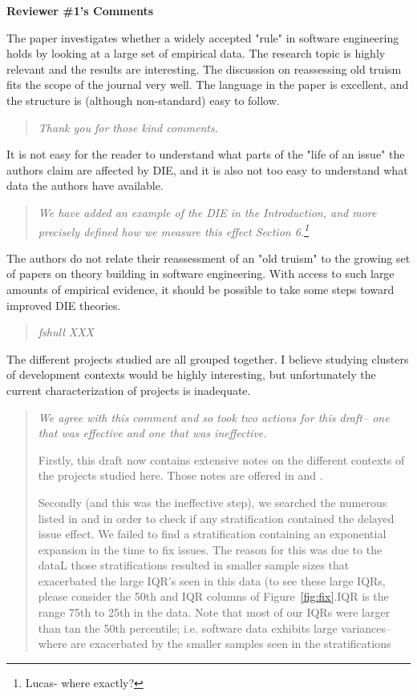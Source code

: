 {\bf Reviewer \#1's Comments}


The paper investigates whether a widely
accepted "rule" in software engineering holds by looking at
a large set of empirical data. The research topic is highly
relevant and the results are interesting.   The discussion
on reassessing old truism fits the scope of the journal very
well.  The language in the paper is excellent, and the
structure is (although non-standard) easy to follow.

\begin{quote}{\em Thank you for those kind comments.}\end{quote}

It is not easy for the reader to understand what parts
of the "life of an issue" the authors claim are affected by
DIE, and it is also not too easy to understand what data the
authors have available.  

\begin{quote}{\em  We have added an example of the DIE in the Introduction, and more precisely defined how we measure this effect Section 6.\footnote{Lucas- where exactly?} }\end{quote}
 
 The authors do not relate their reassessment of an
"old truism" to the growing set of papers on theory building
in software engineering. With access to such large amounts
of empirical evidence, it should be possible to take some
steps toward improved DIE theories. 

\begin{quote}{\em  fshull XXX }\end{quote}

The different projects studied are all grouped together. I
believe studying clusters of development contexts would be
highly interesting, but unfortunately the current
characterization of projects is inadequate.  

\begin{quote}{\em  We agree with this comment and so took two actions for this draft-- one that was effective and one that was ineffective. 

Firstly, this draft now contains extensive notes on the different contexts of the
projects studied here. Those notes are offered in  and .

Secondly (and this was the ineffective step), we  searched the numerous   listed in  and 
in order to check if any stratification contained the delayed issue effect. We failed to find a stratification
containing an exponential expansion in the time to fix issues. The reason for this was due to the dataL those
stratifications resulted in smaller sample sizes that exacerbated the large IQR's seen in this data
(to see these large IQRs,  please consider the 50th and IQR columns of Figure~\ref{fig:fix}.IQR is the
range 75th to 25th in the data. Note that most of our IQRs were larger than tan the 50th percentile; i.e. software
data exhibits large variances-- where are exacerbated by the smaller samples seen in the stratifications
 }\end{quote}




